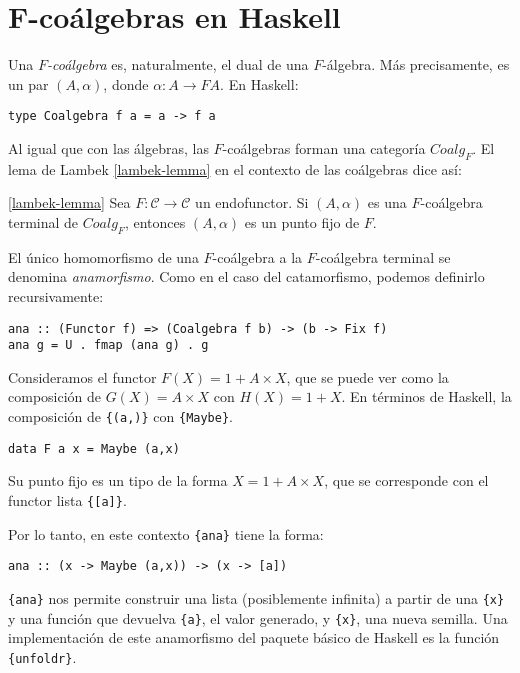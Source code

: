 \documentclass[12pt, twoside]{book}
\newcommand{\newterm}[1]{\index{#1}\emph{#1}}
\newcommand{\code}[1]{\Verb+{#1}+}
\newcommand{\cat}{{\mathcal{C}}}
\begin{document}
\section{F-coálgebras en Haskell}
Una \emph{$F$-coálgebra} es, naturalmente, el dual de una $F$-álgebra.
Más precisamente, es un par $(A,\alpha)$, donde $\alpha \colon A \to F A$.
En Haskell:
\begin{verbatim}
type Coalgebra f a = a -> f a
\end{verbatim}

Al igual que con las álgebras, las $F$-coálgebras forman una categoría $Coalg_F$.
El lema de Lambek \eqref{lambek-lemma} en el contexto de las coálgebras dice así:
\begin{lemma}\ref{lambek-lemma}
Sea $F \colon \cat \to \cat$ un endofunctor.
Si $(A,\alpha)$ es una $F$-coálgebra terminal de $Coalg_F$, entonces $(A,\alpha)$ es un punto fijo de $F$.
\end{lemma}

El único homomorfismo de una $F$-coálgebra a la $F$-coálgebra terminal se denomina \newterm{anamorfismo}.
Como en el caso del catamorfismo, podemos definirlo recursivamente:
\begin{verbatim}
ana :: (Functor f) => (Coalgebra f b) -> (b -> Fix f)
ana g = U . fmap (ana g) . g
\end{verbatim}

\begin{example}
Consideramos el functor $F(X)=1+A\times X$, que se puede ver como la composición de $G(X) = A \times X$ con $H(X) = 1+X$.
En términos de Haskell, la composición de \code{(a,)} con \code{Maybe}.
\begin{verbatim}
data F a x = Maybe (a,x)
\end{verbatim}
Su punto fijo es un tipo de la forma $X = 1 + A \times X$, que se corresponde con el functor lista \code{[a]}.

Por lo tanto, en este contexto \code{ana} tiene la forma:
\begin{verbatim}
ana :: (x -> Maybe (a,x)) -> (x -> [a])
\end{verbatim}
\code{ana} nos permite construir una lista (posiblemente infinita) a partir de una  \code{x} y una función que devuelva \code{a}, el valor generado, y \code{x}, una nueva semilla. 
Una implementación de este anamorfismo del paquete básico de Haskell es la función \code{unfoldr}.
\end{example}
\end{document}
